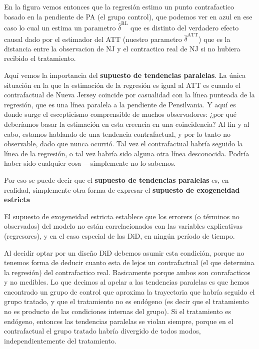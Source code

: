 \documentclass[
  letterpaper,
  DIV=11,
  numbers=noendperiod,
  oneside]{scrreprt}
\begin{document}
En la figura vemos entonces que la regresión estimo un punto
contrafactico basado en la pendiente de PA (el grupo control), que
podemos ver en azul en ese caso lo cual un estima un parametro
\(\hat{\delta}^\text{RL}\) que es distinto del verdadero efecto causal
dado por el estimador del ATT (nuestro parametro
\(\hat{\delta}^\text{ATT}\)) que es la distancia entre la observacion de
NJ y el contractico real de NJ si no hubiera recibido el tratamiento.

Aquí vemos la importancia del \textbf{supuesto de tendencias paralelas}.
La única situación en la que la estimación de la regresión es igual al
ATT es cuando el contrafactual de Nueva Jersey coincide por casualidad
con la línea punteada de la regresión, que es una línea paralela a la
pendiente de Pensilvania. Y aquí es donde surge el escepticismo
comprensible de muchos observadores: ¿por qué deberíamos basar la
estimación en esta creencia en una coincidencia? Al fin y al cabo,
estamos hablando de una tendencia contrafactual, y por lo tanto no
observable, dado que nunca ocurrió. Tal vez el contrafactual habría
seguido la línea de la regresión, o tal vez habría sido alguna otra
línea desconocida. Podría haber sido cualquier cosa ---simplemente no lo
sabemos.

Por eso se puede decir que el \textbf{supuesto de tendencias paralelas}
es, en realidad, simplemente otra forma de expresar el \textbf{supuesto
de exogeneidad estricta}

\begin{tcolorbox}[enhanced jigsaw, breakable, colback=white, rightrule=.15mm, opacityback=0, colframe=quarto-callout-color-frame, bottomrule=.15mm, left=2mm, toprule=.15mm, leftrule=.75mm, arc=.35mm]
El supuesto de exogeneidad estricta establece que los errorers (o
términos no observados) del modelo no están correlacionados con las
variables explicativas (regresores), y en el caso especial de las DiD,
en ningún período de tiempo.
\end{tcolorbox}

Al decidir optar por un diseño DiD debemos asumir esta condición, porque
no tenemos forma de deducir cuanto esta de lejos un contrafactual (el
que determina la regresión) del contrafactico real. Basicamente porque
ambos son conrafacticos y no medibles. Lo que decimos al apelar a las
tendencias paralelas es que hemos encontrado un grupo de control que
aproxima la trayectoria que habría seguido el grupo tratado, y que el
tratamiento no es endógeno (es decir que el tratamiento no es producto
de las condiciones internas del grupo). Si el tratamiento es endógeno,
entonces las tendencias paralelas se violan siempre, porque en el
contrafactual el grupo tratado habría divergido de todos modos,
independientemente del tratamiento.
\end{document}
